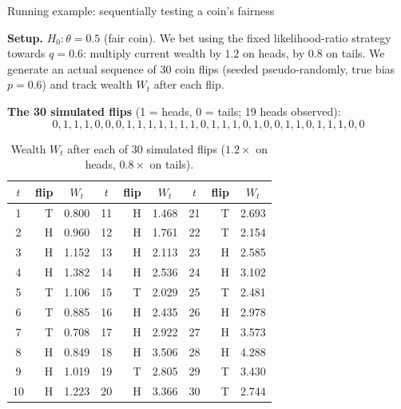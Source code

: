 \documentclass[aspectratio=169,10pt]{beamer}
\begin{document}
\begin{frame}[allowframebreaks]{Running example: sequentially testing a coin's fairness}

\textbf{Setup.} $H_0: \theta = 0.5$ (fair coin). We bet using the fixed likelihood-ratio strategy towards
$q = 0.6$: multiply current wealth by $1.2$ on heads, by $0.8$ on tails. We generate an actual sequence of 30 coin
flips (seeded pseudo-randomly, true bias $p=0.6$) and track wealth $W_t$ after each flip.

\textbf{The 30 simulated flips} (1 = heads, 0 = tails; 19 heads observed):
$$0,1,1,1,0,0,0,1,1,1,1,1,1,1,0,1,1,1,0,1,0,0,1,1,0,1,1,1,0,0$$

\framebreak

\begin{table}
\centering
\scriptsize
\begin{tabular}{crc @{\hspace{1.2cm}} crc @{\hspace{1.2cm}} crc}
\toprule
$t$ & flip & $W_t$ & $t$ & flip & $W_t$ & $t$ & flip & $W_t$ \\
\midrule
1  & T & 0.800 & 11 & H & 1.468 & 21 & T & 2.693 \\
2  & H & 0.960 & 12 & H & 1.761 & 22 & T & 2.154 \\
3  & H & 1.152 & 13 & H & 2.113 & 23 & H & 2.585 \\
4  & H & 1.382 & 14 & H & 2.536 & 24 & H & 3.102 \\
5  & T & 1.106 & 15 & T & 2.029 & 25 & T & 2.481 \\
6  & T & 0.885 & 16 & H & 2.435 & 26 & H & 2.978 \\
7  & T & 0.708 & 17 & H & 2.922 & 27 & H & 3.573 \\
8  & H & 0.849 & 18 & H & 3.506 & 28 & H & 4.288 \\
9  & H & 1.019 & 19 & T & 2.805 & 29 & T & 3.430 \\
10 & H & 1.223 & 20 & H & 3.366 & 30 & T & 2.744 \\
\bottomrule
\end{tabular}
\caption{\scriptsize Wealth $W_t$ after each of 30 simulated flips ($1.2\times$ on heads, $0.8\times$ on tails).}
\end{table}

\framebreak


\end{frame}
\end{document}
